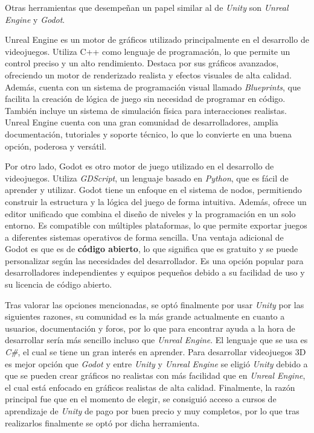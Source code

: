 Otras herramientas que desempeñan un papel similar al de \textit{Unity} son \textit{Unreal Engine} y \textit{Godot}.

Unreal Engine es un motor de gráficos utilizado principalmente en el desarrollo de videojuegos. Utiliza C++ como lenguaje de programación, lo que permite un control preciso y un alto rendimiento. Destaca por sus gráficos avanzados, ofreciendo un motor de renderizado realista y efectos visuales de alta calidad. Además, cuenta con un sistema de programación visual llamado \textit{Blueprints}, que facilita la creación de lógica de juego sin necesidad de programar en código. También incluye un sistema de simulación física para interacciones realistas. Unreal Engine cuenta con una gran comunidad de desarrolladores, amplia documentación, tutoriales y soporte técnico, lo que lo convierte en una buena opción, poderosa y versátil.

Por otro lado, Godot es otro motor de juego utilizado en el desarrollo de videojuegos. Utiliza \textit{GDScript}, un lenguaje basado en \textit{Python}, que es fácil de aprender y utilizar. Godot tiene un enfoque en el sistema de nodos, permitiendo construir la estructura y la lógica del juego de forma intuitiva. Además, ofrece un editor unificado que combina el diseño de niveles y la programación en un solo entorno. Es compatible con múltiples plataformas, lo que permite exportar juegos a diferentes sistemas operativos de forma sencilla. Una ventaja adicional de Godot es que es de \textbf{código abierto}, lo que significa que es gratuito y se puede personalizar según las necesidades del desarrollador. Es una opción popular para desarrolladores independientes y equipos pequeños debido a su facilidad de uso y su licencia de código abierto.

Tras valorar las opciones mencionadas, se optó finalmente por usar \textit{Unity} por las siguientes razones, su comunidad es la más grande actualmente en cuanto a usuarios, documentación y foros, por lo que para encontrar ayuda a la hora de desarrollar sería más sencillo incluso que \textit{Unreal Engine}. El lenguaje que se usa es \textit{C\#}, el cual se tiene un gran interés en aprender. Para desarrollar videojuegos 3D es mejor opción que \textit{Godot} y entre \textit{Unity} y \textit{Unreal Engine} se eligió \textit{Unity} debido a que se pueden crear gráficos no realistas con más facilidad que en \textit{Unreal Engine}, el cual está enfocado en gráficos realistas de alta calidad. Finalmente, la razón principal fue que en el momento de elegir, se consiguió acceso a cursos de aprendizaje de \textit{Unity} de pago por buen precio y muy completos, por lo que tras realizarlos finalmente se optó por dicha herramienta.

